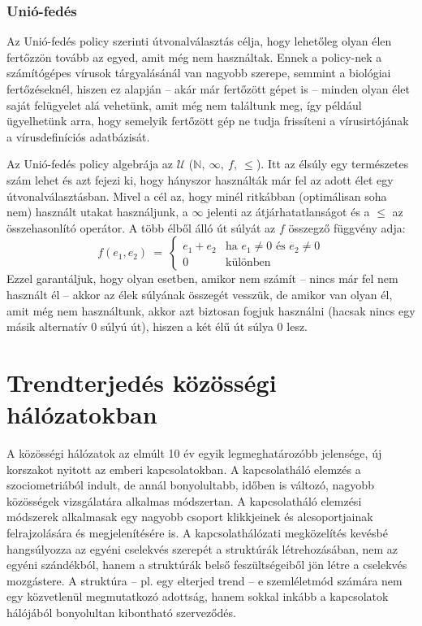       \subsubsection{Unió-fedés}
      Az Unió-fedés policy szerinti útvonalválasztás célja, hogy lehetőleg olyan élen fertőzzön tovább az egyed, amit még nem használtak. Ennek a policy-nek a számítógépes vírusok tárgyalásánál van nagyobb szerepe, semmint a biológiai fertőzéseknél, hiszen ez alapján -- akár már fertőzött gépet is -- minden olyan élet saját felügyelet alá vehetünk, amit még nem találtunk meg, így például ügyelhetünk arra, hogy semelyik fertőzött gép ne tudja frissíteni a vírusirtójának a vírusdefiníciós adatbázisát.

      Az Unió-fedés policy algebrája az $\mathcal{U}$ ($\mathbb{N},~\infty,~f,~\leq$). Itt az élsúly egy természetes szám lehet és azt fejezi ki, hogy hányszor használták már fel az adott élet egy útvonalválasztásban. Mivel a cél az, hogy minél ritkábban (optimálisan soha nem) használt utakat használjunk, a $\infty$ jelenti az átjárhatatlanságot és a $\leq$ az összehasonlító operátor. A több élből álló út súlyát az $f$ összegző függvény adja:
      $$f(e_1,e_2)~=~
      \begin{cases}
        e_1+e_2 & \text{ha } e_1 \neq 0 \text{ és } e_2 \neq 0\\
        0 & \text{különben}
      \end{cases}$$
      Ezzel garantáljuk, hogy olyan esetben, amikor nem számít -- nincs már fel nem használt él -- akkor az élek súlyának összegét vesszük, de amikor van olyan él, amit még nem használtunk, akkor azt biztosan fogjuk használni (hacsak nincs egy másik alternatív 0 súlyú út), hiszen a két élű út súlya 0 lesz.

  \section{Trendterjedés közösségi hálózatokban}
  A közösségi hálózatok az elmúlt 10 év egyik legmeghatározóbb jelensége, új korszakot nyitott az emberi kapcsolatokban. A kapcsolatháló elemzés a szociometriából indult, de annál bonyolultabb, időben is változó, nagyobb közösségek vizsgálatára alkalmas módszertan. A kapcsolatháló elemzési módszerek alkalmasak egy nagyobb csoport klikkjeinek és alcsoportjainak felrajzolására és megjelenítésére is. A kapcsolathálózati megközelítés kevésbé hangsúlyozza az egyéni cselekvés szerepét a struktúrák létrehozásában, nem az egyéni szándékból, hanem a struktúrák belső feszültségeiből jön létre a cselekvés mozgástere. A struktúra -- pl. egy elterjed trend -- e szemléletmód számára nem egy közvetlenül megmutatkozó adottság, hanem sokkal inkább a kapcsolatok hálójából bonyolultan kibontható szerveződés.

